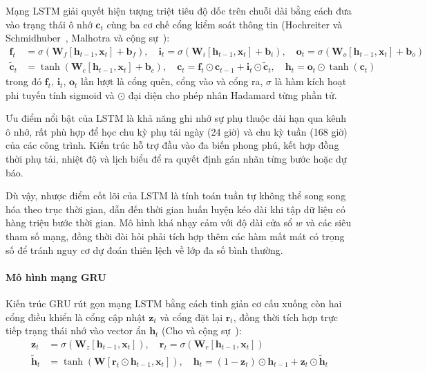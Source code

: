 Mạng LSTM giải quyết hiện tượng triệt tiêu độ dốc trên chuỗi dài bằng cách đưa vào trạng thái ô nhớ $\mathbf{c}_t$ cùng ba cơ chế cổng kiểm soát thông tin (Hochreiter và Schmidhuber~\cite{lstm}, Malhotra và cộng sự~\cite{lstm_ad}):
\begin{equation*}
\begin{aligned}
    \mathbf{f}_t &= \sigma\left(\mathbf{W}_f [\mathbf{h}_{t-1}, \mathbf{x}_t] + \mathbf{b}_f\right), \quad
    \mathbf{i}_t = \sigma\left(\mathbf{W}_i [\mathbf{h}_{t-1}, \mathbf{x}_t] + \mathbf{b}_i\right), \quad
    \mathbf{o}_t = \sigma\left(\mathbf{W}_o [\mathbf{h}_{t-1}, \mathbf{x}_t] + \mathbf{b}_o\right) \\
    \tilde{\mathbf{c}}_t &= \tanh\left(\mathbf{W}_c [\mathbf{h}_{t-1}, \mathbf{x}_t] + \mathbf{b}_c\right), \quad
    \mathbf{c}_t = \mathbf{f}_t \odot \mathbf{c}_{t-1} + \mathbf{i}_t \odot \tilde{\mathbf{c}}_t, \quad
    \mathbf{h}_t = \mathbf{o}_t \odot \tanh(\mathbf{c}_t)
\end{aligned}
\end{equation*}
trong đó $\mathbf{f}_t$, $\mathbf{i}_t$, $\mathbf{o}_t$ lần lượt là cổng quên, cổng vào và cổng ra, $\sigma$ là hàm kích hoạt phi tuyến tính sigmoid và $\odot$ đại diện cho phép nhân Hadamard từng phần tử.

Ưu điểm nổi bật của LSTM là khả năng ghi nhớ sự phụ thuộc dài hạn qua kênh ô nhớ, rất phù hợp để học chu kỳ phụ tải ngày (24 giờ) và chu kỳ tuần (168 giờ) của các công trình. Kiến trúc hỗ trợ đầu vào đa biến phong phú, kết hợp đồng thời phụ tải, nhiệt độ và lịch biểu để ra quyết định gán nhãn từng bước hoặc dự báo.

Dù vậy, nhược điểm cốt lõi của LSTM là tính toán tuần tự không thể song song hóa theo trục thời gian, dẫn đến thời gian huấn luyện kéo dài khi tập dữ liệu có hàng triệu bước thời gian. Mô hình khá nhạy cảm với độ dài cửa sổ $w$ và các siêu tham số mạng, đồng thời đòi hỏi phải tích hợp thêm các hàm mất mát có trọng số để tránh nguy cơ dự đoán thiên lệch về lớp đa số bình thường.

\paragraph{Mô hình mạng GRU}

Kiến trúc GRU rút gọn mạng LSTM bằng cách tinh giản cơ cấu xuống còn hai cổng điều khiển là cổng cập nhật $\mathbf{z}_t$ và cổng đặt lại $\mathbf{r}_t$, đồng thời tích hợp trực tiếp trạng thái nhớ vào vector ẩn $\mathbf{h}_t$ (Cho và cộng sự~\cite{gru}):
\begin{equation*}
\begin{aligned}
    \mathbf{z}_t &= \sigma\left(\mathbf{W}_z [\mathbf{h}_{t-1}, \mathbf{x}_t]\right), \quad
    \mathbf{r}_t = \sigma\left(\mathbf{W}_r [\mathbf{h}_{t-1}, \mathbf{x}_t]\right) \\
    \tilde{\mathbf{h}}_t &= \tanh\left(\mathbf{W} [\mathbf{r}_t \odot \mathbf{h}_{t-1}, \mathbf{x}_t]\right), \quad
    \mathbf{h}_t = (1 - \mathbf{z}_t) \odot \mathbf{h}_{t-1} + \mathbf{z}_t \odot \tilde{\mathbf{h}}_t
\end{aligned}
\end{equation*}

